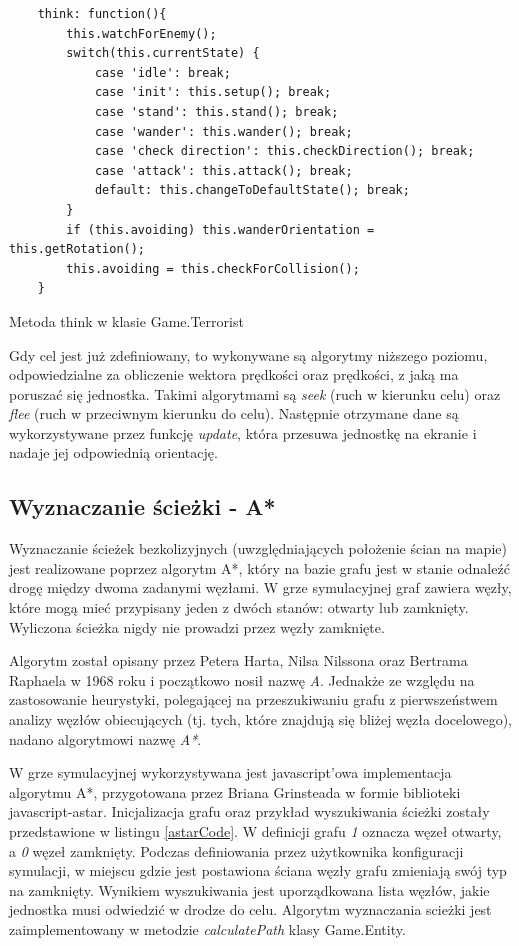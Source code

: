 \begin{table}
\begin{center}
\begin{lstlisting}
    think: function(){
        this.watchForEnemy();
        switch(this.currentState) {
            case 'idle': break;
            case 'init': this.setup(); break;
            case 'stand': this.stand(); break;
            case 'wander': this.wander(); break;
            case 'check direction': this.checkDirection(); break;
            case 'attack': this.attack(); break;
            default: this.changeToDefaultState(); break;
        }
        if (this.avoiding) this.wanderOrientation = this.getRotation();
        this.avoiding = this.checkForCollision();
    }
 \end{lstlisting}
\caption {Metoda think w klasie Game.Terrorist}
\label{thinkTer}
\end{center}
\end{table}

Gdy cel jest już zdefiniowany, to wykonywane są algorytmy niższego poziomu, odpowiedzialne za obliczenie wektora prędkości oraz prędkości, z jaką ma poruszać się jednostka. Takimi algorytmami są \emph{seek} (ruch w kierunku celu) oraz \emph{flee} (ruch w przeciwnym kierunku do celu). Następnie otrzymane dane są wykorzystywane przez funkcję \emph{update}, która przesuwa jednostkę na ekranie i nadaje jej odpowiednią orientację.

\subsection{Wyznaczanie ścieżki - A*}
Wyznaczanie ścieżek bezkolizyjnych (uwzględniających położenie ścian na mapie) jest realizowane poprzez algorytm A*, który na bazie grafu jest w stanie odnaleźć drogę między dwoma zadanymi węzłami. W grze symulacyjnej graf zawiera węzły, które mogą mieć przypisany jeden z dwóch stanów: otwarty lub zamknięty. Wyliczona ścieżka nigdy nie prowadzi przez węzły zamknięte.

Algorytm został opisany przez Petera Harta, Nilsa Nilssona oraz Bertrama Raphaela w 1968 roku i początkowo nosił nazwę \emph{A}. Jednakże ze względu na zastosowanie heurystyki, polegającej na przeszukiwaniu grafu z pierwszeństwem analizy węzłów obiecujących (tj. tych, które znajdują się bliżej węzła docelowego), nadano algorytmowi nazwę \emph{A*}.

W grze symulacyjnej wykorzystywana jest javascript'owa implementacja algorytmu A*, przygotowana przez Briana Grinsteada w formie biblioteki javascript-astar\cite{astarPage}. Inicjalizacja grafu oraz przykład wyszukiwania ścieżki zostały przedstawione w listingu \ref{astarCode}. W definicji grafu \emph{1} oznacza węzeł otwarty, a \emph{0} węzeł zamknięty. Podczas definiowania przez użytkownika konfiguracji symulacji, w miejscu gdzie jest postawiona ściana węzły grafu zmieniają swój typ na zamknięty. Wynikiem wyszukiwania jest uporządkowana lista węzłów, jakie jednostka musi odwiedzić w drodze do celu. Algorytm wyznaczania scieżki jest zaimplementowany w metodzie \emph{calculatePath} klasy Game.Entity.

